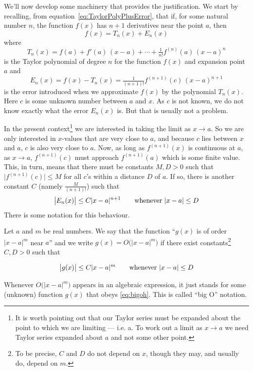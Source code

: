 We'll now develop some machinery that provides the
justification.
We start by recalling, from equation~\eqref{eq:TaylorPolyPlusError},
that if, for some natural number $n$, the function $f(x)$ has
$n+1$ derivatives near the point $a$, then
\begin{equation*}
f(x)
=T_n(x) +E_n(x)
\end{equation*}
where
\begin{equation*}
T_n(x)=f(a)+f'(a)\,(x-a)+\cdots+\tfrac{1}{n!}f^{(n)}(a)\, (x-a)^n
\end{equation*}
is the Taylor polynomial of degree $n$ for the function $f(x)$ and expansion
point $a$ and
\begin{equation*}
E_n(x)=f(x)-T_n(x)=\tfrac{1}{(n+1)!}f^{(n+1)}(c)\, (x-a)^{n+1}
\end{equation*}
is the error introduced when we approximate $f(x)$ by the polynomial $T_n(x)$.
Here $c$ is some unknown number between $a$ and $x$. As $c$ is not known,
we do not know exactly what the error $E_n(x)$ is. But that is usually not a problem.

In the present context\footnote{It is worth pointing out that
our Taylor series must be expanded about the point to
which we are limiting --- i.e. a. To work out a limit as
$x\to a$ we need Taylor series expanded about $a$ and not
some other point.} we are interested in taking the limit as
$x \to a$.  So we are only interested in $x$-values that are
very close to $a$, and because $c$ lies between $x$ and $a$,
$c$ is also very close to $a$. Now, as long as
$f^{(n+1)}(x)$ is continuous at $a$, as $x \to a$,
$f^{(n+1)}(c)$ must approach $f^{(n+1)}(a)$ which is
some finite value. This, in turn,  means that there must be
constants $M,D>0$ such that $\big|f^{(n+1)}(c)\big|\le M$
for all $c$'s within a distance $D$ of $a$. If so, there is
another constant $C$ (namely $\tfrac{M}{(n+1)!}$) such that
\begin{equation*}
\big|E_n(x)\big|\le C |x-a|^{n+1}\qquad\hbox{whenever }|x-a|\le D
\end{equation*}
There is some notation for this behaviour.

\begin{defn}\label{def:bigoh}
Let $a$ and $m$ be real numbers. We say that the function
``$g(x)$ is of order $|x-a|^m$ near $a$'' and we write
$g(x)=O\big(|x-a|^m\big)$ if there exist constants\footnote{To be precise,
$C$ and $D$ do not depend on $x$, though they may, and usually do,
depend on $m$.}
$C,D>0$ such that
\begin{impeqn}\label{eq:bigoh}
\begin{equation*}
\big|g(x)\big|\le C |x-a|^m\qquad\hbox{whenever }|x-a|\le D
\end{equation*}
\end{impeqn}
Whenever $O\big(|x-a|^m\big)$ appears in an algebraic expression,
it just stands for some (unknown) function $g(x)$ that obeys \eqref{eq:bigoh}.
This is called ``big O'' notation.
\end{defn}

